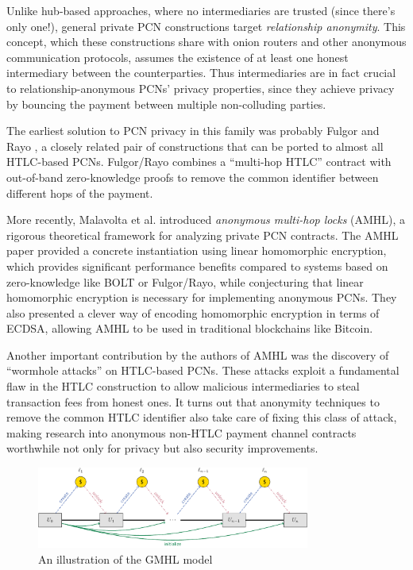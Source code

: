 \documentclass[USenglish,oneside,twocolumn]{article}
\begin{document}
Unlike hub-based approaches, where no intermediaries are trusted (since there's only one!), general private PCN constructions target \emph{relationship anonymity}. This concept, which these constructions share with onion routers and other anonymous communication protocols, assumes the existence of at least one honest intermediary between the counterparties. Thus intermediaries are in fact crucial to relationship-anonymous PCNs' privacy properties, since they achieve privacy by bouncing the payment between multiple non-colluding parties.

The earliest solution to PCN privacy in this family was probably Fulgor and Rayo \cite{malavolta2017concurrency}, a closely related pair of constructions that can be ported to almost all HTLC-based PCNs. Fulgor/Rayo combines a ``multi-hop HTLC'' contract with out-of-band zero-knowledge proofs to remove the common identifier between different hops of the payment.

More recently, Malavolta et al. \cite{malavolta2019anonymous} introduced \emph{anonymous multi-hop locks} (AMHL), a rigorous theoretical framework for analyzing private PCN contracts. The AMHL paper provided a concrete instantiation using linear homomorphic encryption, which provides significant performance benefits compared to systems based on zero-knowledge like BOLT or Fulgor/Rayo, while conjecturing that linear homomorphic encryption is necessary for implementing anonymous PCNs. They also presented a clever way of encoding homomorphic encryption in terms of ECDSA, allowing AMHL to be used in traditional blockchains like Bitcoin.

Another important contribution by the authors of AMHL was the discovery of ``wormhole attacks'' on HTLC-based PCNs. These attacks exploit a fundamental flaw in the HTLC construction to allow malicious intermediaries to steal transaction fees from honest ones. It turns out that anonymity techniques to remove the common HTLC identifier also take care of fixing this class of attack, making research into anonymous non-HTLC payment channel contracts worthwhile not only for privacy but also security improvements.

\begin{figure}
    \centering
    \includegraphics[width=0.8\textwidth]{graphics/coinpassing.pdf}
    \caption{An illustration of the GMHL model}
    \label{fig:coinpassing}
\end{figure}
\end{document}
